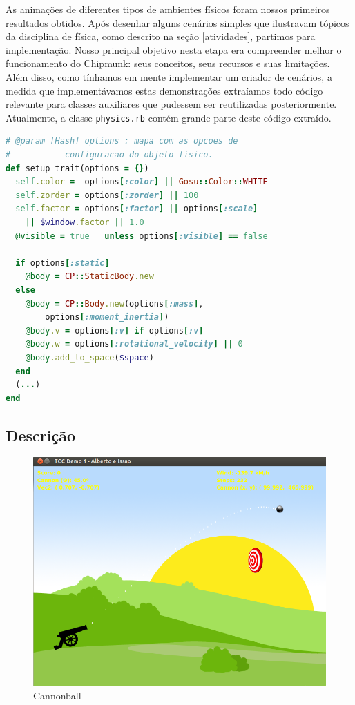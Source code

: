 As animações de diferentes tipos de ambientes físicos foram nossos primeiros resultados obtidos. Após desenhar alguns cenários simples que ilustravam tópicos da disciplina de física, como descrito na seção \ref{atividades}, partimos para implementação. Nosso principal objetivo nesta etapa era compreender melhor o funcionamento do Chipmunk: seus conceitos, seus recursos e suas limitações. \\

Além disso, como tínhamos em mente implementar um criador de cenários, a medida que implementávamos estas demonstrações extraíamos todo código relevante para classes auxiliares que pudessem ser reutilizadas posteriormente. Atualmente, a classe {\tt physics.rb} contém grande parte deste código extraído. \\

\begin{lstlisting}[language=Ruby, caption=Trecho de código do physics.rb]
# @param [Hash] options : mapa com as opcoes de 
#           configuracao do objeto fisico.
def setup_trait(options = {})
  self.color =  options[:color] || Gosu::Color::WHITE
  self.zorder = options[:zorder] || 100
  self.factor = options[:factor] || options[:scale] 
    || $window.factor || 1.0
  @visible = true   unless options[:visible] == false

  if options[:static]
    @body = CP::StaticBody.new
  else
    @body = CP::Body.new(options[:mass], 
        options[:moment_inertia])
    @body.v = options[:v] if options[:v]  
    @body.w = options[:rotational_velocity] || 0
    @body.add_to_space($space)
  end
  (...)
end
\end{lstlisting}

\subsection{Descrição}

\begin{figure}[H]
	\centering
	\includegraphics[scale=0.4]{images/cannonball.png}
	\caption{Cannonball}
	\hspace{0.5cm}
\end{figure}

